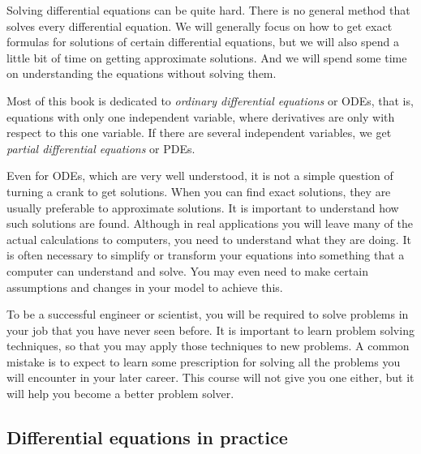 Solving differential equations can be quite hard.
There is no general method that solves every differential equation.  We will
generally focus on how to get exact formulas for solutions of certain
differential
equations, but we will also spend a little bit of time
on getting approximate solutions.
And we will spend some time on understanding the equations without solving
them.

Most of this book is dedicated to
\emph{ordinary differential equations}
or ODEs, that is, equations with
only one independent variable, where derivatives are only with respect to
this one variable.
If there are several independent variables, we get
\emph{partial differential equations}
or PDEs.

Even for ODEs, which are very well understood, it is not a simple question
of turning a crank to get solutions.
When you can find exact solutions, they are usually preferable to
approximate solutions.  It is important to understand how
such solutions are found.
Although in real applications you will
leave many of the actual calculations to computers, you
need to understand what they are doing.  It is often necessary
to simplify or transform your equations into something that a computer can
understand and solve.
You may even need to make certain assumptions and changes in your
model to achieve this.

To be a successful engineer or scientist, you will be required to solve
problems in your job that you have never seen before.  It is important to
learn problem solving techniques, so that you may apply those techniques to
new problems.  A common mistake is to expect to learn some prescription for
solving all the problems you will encounter in your later career.
This course will not give you one either, but it will help you become a
better problem solver.

\subsection{Differential equations in practice}

